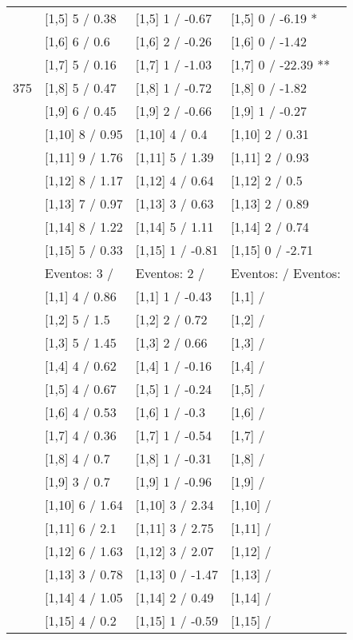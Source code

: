 \begin{table}
\begin{tabular}[t]{llll}
 & {}[1,5] 5  / 0.38 & {}[1,5] 1  / -0.67 & {}[1,5] 0  / -6.19 *\\
 & {}[1,6] 6  / 0.6 & {}[1,6] 2  / -0.26 & {}[1,6] 0  / -1.42\\
 & {}[1,7] 5  / 0.16 & {}[1,7] 1  / -1.03 & {}[1,7] 0  / -22.39 **\\
375 & {}[1,8] 5  / 0.47 & {}[1,8] 1  / -0.72 & {}[1,8] 0  / -1.82\\
\addlinespace
 & {}[1,9] 6  / 0.45 & {}[1,9] 2  / -0.66 & {}[1,9] 1  / -0.27\\
 & {}[1,10] 8  / 0.95 & {}[1,10] 4  / 0.4 & {}[1,10] 2  / 0.31\\
 & {}[1,11] 9  / 1.76 & {}[1,11] 5  / 1.39 & {}[1,11] 2  / 0.93\\
 & {}[1,12] 8  / 1.17 & {}[1,12] 4  / 0.64 & {}[1,12] 2  / 0.5\\
 & {}[1,13] 7  / 0.97 & {}[1,13] 3  / 0.63 & {}[1,13] 2  / 0.89\\
\addlinespace
 & {}[1,14] 8  / 1.22 & {}[1,14] 5  / 1.11 & {}[1,14] 2  / 0.74\\
 & {}[1,15] 5  / 0.33 & {}[1,15] 1  / -0.81 & {}[1,15] 0  / -2.71\\
 & Eventos:  3 / & Eventos:  2 / & Eventos:   / Eventos:\\
 & {}[1,1] 4  / 0.86 & {}[1,1] 1  / -0.43 & {}[1,1]  /\\
 & {}[1,2] 5  / 1.5 & {}[1,2] 2  / 0.72 & {}[1,2]  /\\
\addlinespace
 & {}[1,3] 5  / 1.45 & {}[1,3] 2  / 0.66 & {}[1,3]  /\\
 & {}[1,4] 4  / 0.62 & {}[1,4] 1  / -0.16 & {}[1,4]  /\\
 & {}[1,5] 4  / 0.67 & {}[1,5] 1  / -0.24 & {}[1,5]  /\\
 & {}[1,6] 4  / 0.53 & {}[1,6] 1  / -0.3 & {}[1,6]  /\\
 & {}[1,7] 4  / 0.36 & {}[1,7] 1  / -0.54 & {}[1,7]  /\\
\addlinespace
500 & {}[1,8] 4  / 0.7 & {}[1,8] 1  / -0.31 & {}[1,8]  /\\
 & {}[1,9] 3  / 0.7 & {}[1,9] 1  / -0.96 & {}[1,9]  /\\
 & {}[1,10] 6  / 1.64 & {}[1,10] 3  / 2.34 & {}[1,10]  /\\
 & {}[1,11] 6  / 2.1 & {}[1,11] 3  / 2.75 & {}[1,11]  /\\
 & {}[1,12] 6  / 1.63 & {}[1,12] 3  / 2.07 & {}[1,12]  /\\
\addlinespace
 & {}[1,13] 3  / 0.78 & {}[1,13] 0  / -1.47 & {}[1,13]  /\\
 & {}[1,14] 4  / 1.05 & {}[1,14] 2  / 0.49 & {}[1,14]  /\\
 & {}[1,15] 4  / 0.2 & {}[1,15] 1  / -0.59 & {}[1,15]  /\\
\bottomrule
\end{tabular}
\end{table}
